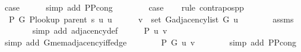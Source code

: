 \begin{isabellebody}
\ {\isacharquery}{\kern0pt}case\isanewline
\ \ \ \ \isamarkupfalse%
\ {\isacharparenleft}{\kern0pt}simp\ add{\isacharcolon}{\kern0pt}\ P{\isacharunderscore}{\kern0pt}P{\isacharprime}{\kern0pt}{\isacharprime}{\kern0pt}{\isacharunderscore}{\kern0pt}cong{\isacharparenright}{\kern0pt}\isanewline
{}\isamarkupfalse%
\isanewline
\ \ \isamarkupfalse%
\ {}\isanewline
\ \ \isamarkupfalse%
\ {\isacharquery}{\kern0pt}case\isanewline
\ \ \isamarkupfalse%
\ {\isacharparenleft}{\kern0pt}rule\ contrapos{\isacharunderscore}{\kern0pt}pp{\isacharparenright}{\kern0pt}\isanewline
\ \ \ \ \isamarkupfalse%
\ {\isachardoublequoteopen}{\isasymnot}\ P{\isacharprime}{\kern0pt}\ G{}\ {\isacharparenleft}{\kern0pt}P{\isacharunderscore}{\kern0pt}lookup\ {\isacharparenleft}{\kern0pt}parent\ s{\isacharparenright}{\kern0pt}\ u{\isacharparenright}{\kern0pt}\ u{\isachardoublequoteclose}\isanewline
\ \ \ \ \isamarkupfalse%
\ {\isachardoublequoteopen}v\ {\isasymin}\ set\ {\isacharparenleft}{\kern0pt}G{\isachardot}{\kern0pt}adjacency{\isacharunderscore}{\kern0pt}list\ G{}\ u{\isacharparenright}{\kern0pt}{\isachardoublequoteclose}\isanewline
\ \ \ \ \ \ \isamarkupfalse%
\ assms\isanewline
\ \ \ \ \ \ \isamarkupfalse%
\ {\isacharparenleft}{\kern0pt}simp\ add{\isacharcolon}{\kern0pt}\ adjacency{\isacharunderscore}{\kern0pt}def{\isacharparenright}{\kern0pt}\isanewline
\ \ \ \ \isamarkupfalse%
\ {\isachardoublequoteopen}P{\isacharprime}{\kern0pt}{\isacharprime}{\kern0pt}\ {\isacharbraceleft}{\kern0pt}u{\isacharcomma}{\kern0pt}\ v{\isacharbraceright}{\kern0pt}{\isachardoublequoteclose}\isanewline
\ \ \ \ \ \ \isamarkupfalse%
\ {\isacharparenleft}{\kern0pt}simp\ add{\isacharcolon}{\kern0pt}\ G{}{\isachardot}{\kern0pt}mem{\isacharunderscore}{\kern0pt}adjacency{\isacharunderscore}{\kern0pt}iff{\isacharunderscore}{\kern0pt}edge{\isacharparenright}{\kern0pt}\isanewline
\ \ \ \ \isamarkupfalse%
\ {\isachardoublequoteopen}{\isasymnot}\ {\isasymnot}\ P\ G{}\ u\ v{\isachardoublequoteclose}\isanewline
\ \ \ \ \ \ \isamarkupfalse%
\ {\isacharparenleft}{\kern0pt}simp\ add{\isacharcolon}{\kern0pt}\ P{\isacharunderscore}{\kern0pt}P{\isacharprime}{\kern0pt}{\isacharprime}{\kern0pt}{\isacharunderscore}{\kern0pt}cong{\isacharparenright}{\kern0pt}\isanewline
\ \ \isamarkupfalse%
\isanewline
{}\isamarkupfalse%
%
\endisatagproof

\end{isabellebody}
